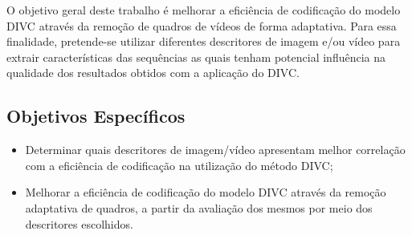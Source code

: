 O objetivo geral deste trabalho é melhorar a eficiência de codificação do modelo \ac{DIVC} através da remoção de quadros de vídeos de forma adaptativa.
Para essa finalidade, pretende-se utilizar diferentes descritores de imagem e/ou vídeo para extrair características das sequências as quais tenham potencial influência na qualidade dos resultados obtidos com a aplicação do \ac{DIVC}.


\subsection*{Objetivos Específicos}

\begin{itemize}
    \item Determinar quais descritores de imagem/vídeo apresentam melhor correlação com a eficiência de codificação na utilização do método \ac{DIVC};
    \item Melhorar a eficiência de codificação do modelo \ac{DIVC} através da remoção adaptativa de quadros, a partir da avaliação dos mesmos por meio dos descritores escolhidos.
\end{itemize}
